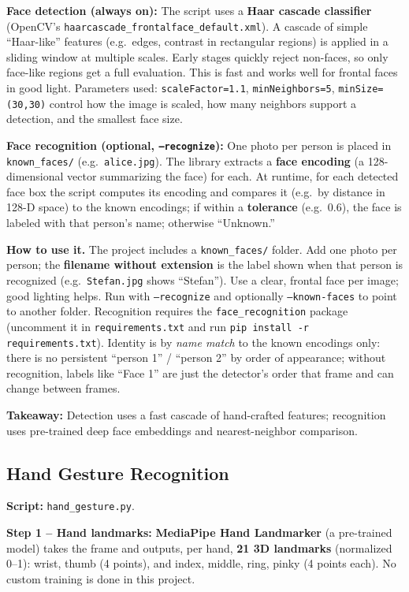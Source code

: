 \documentclass[a4paper,12pt]{article}
\begin{document}
\textbf{Face detection (always on):} The script uses a \textbf{Haar cascade classifier} (OpenCV's \texttt{haarcascade\_frontalface\_default.xml}). A cascade of simple ``Haar-like'' features (e.g.\ edges, contrast in rectangular regions) is applied in a sliding window at multiple scales. Early stages quickly reject non-faces, so only face-like regions get a full evaluation. This is fast and works well for frontal faces in good light. Parameters used: \texttt{scaleFactor=1.1}, \texttt{minNeighbors=5}, \texttt{minSize=(30,30)} control how the image is scaled, how many neighbors support a detection, and the smallest face size.

\textbf{Face recognition (optional, \texttt{--recognize}):} One photo per person is placed in \texttt{known\_faces/} (e.g.\ \texttt{alice.jpg}). The library extracts a \textbf{face encoding} (a 128-dimensional vector summarizing the face) for each. At runtime, for each detected face box the script computes its encoding and compares it (e.g.\ by distance in 128-D space) to the known encodings; if within a \textbf{tolerance} (e.g.\ 0.6), the face is labeled with that person's name; otherwise ``Unknown.''

\textbf{How to use it.} The project includes a \texttt{known\_faces/} folder. Add one photo per person; the \textbf{filename without extension} is the label shown when that person is recognized (e.g.\ \texttt{Stefan.jpg} shows ``Stefan''). Use a clear, frontal face per image; good lighting helps. Run with \texttt{--recognize} and optionally \texttt{--known-faces} to point to another folder. Recognition requires the \texttt{face\_recognition} package (uncomment it in \texttt{requirements.txt} and run \texttt{pip install -r requirements.txt}). Identity is by \emph{name match} to the known encodings only: there is no persistent ``person 1'' / ``person 2'' by order of appearance; without recognition, labels like ``Face 1'' are just the detector's order that frame and can change between frames.

\textbf{Takeaway:} Detection uses a fast cascade of hand-crafted features; recognition uses pre-trained deep face embeddings and nearest-neighbor comparison.

\subsection{Hand Gesture Recognition}
\textbf{Script:} \texttt{hand\_gesture.py}.

\textbf{Step 1 -- Hand landmarks:} \textbf{MediaPipe Hand Landmarker} (a pre-trained model) takes the frame and outputs, per hand, \textbf{21 3D landmarks} (normalized 0--1): wrist, thumb (4 points), and index, middle, ring, pinky (4 points each). No custom training is done in this project.
\end{document}
